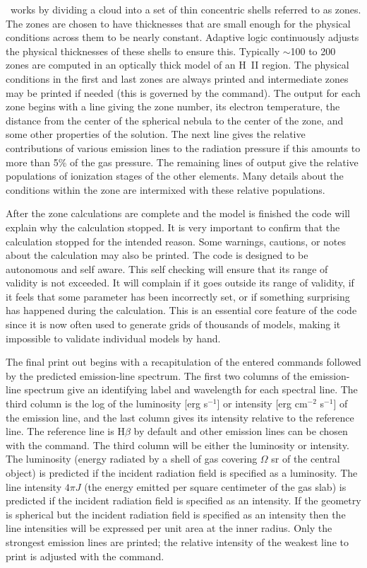 \Cloudy\ works by dividing a cloud into a set of thin concentric shells
referred to as zones. The zones are chosen to have thicknesses that are
small enough for the physical conditions across them to be nearly constant.
Adaptive logic continuously adjusts the physical thicknesses of these shells
to ensure this.  Typically $\sim$100 to 200 zones are computed in an optically
thick model of an H~II region.  The physical conditions in the first and
last zones are always printed and intermediate zones may be printed if needed
(this is governed by the  command).
The output for each zone begins with a line giving the zone number, its
electron temperature, the distance from the center of the spherical nebula
to the center of the zone, and some other properties of the solution.  The
next line gives the relative contributions of various emission lines to
the radiation pressure if this amounts to more than 5\% of the gas pressure.
The remaining lines of output give the relative populations of
ionization stages of the other elements.
Many details about the conditions within the zone are
intermixed with these relative populations.

After the zone calculations are complete and the model is finished the
code will explain why the calculation stopped.  It is very important to
confirm that the calculation stopped for the intended reason.  Some warnings,
cautions, or notes about the calculation may also be printed.  The code
is designed to be autonomous and self aware.  This self checking will ensure
that its range of validity is not exceeded. It will complain if it goes
outside its range of validity, if it feels that some parameter has been
incorrectly set, or if something surprising has happened during the
calculation.  This is an essential core feature of the code since it is
now often used to generate grids of thousands of models, making it impossible
to validate individual models by hand.

The final print out begins with a recapitulation of the entered commands
followed by the predicted emission-line spectrum.  The first two columns
of the emission-line spectrum give an identifying label and wavelength for
each spectral line.  The third column is the log of the luminosity [erg
s$^{-1}$] or intensity [erg cm$^{-2}$ s$^{-1}$] of the emission line, and the last column
gives its intensity relative to the reference line.
The reference line is H$\beta$ by default and other emission lines
can be chosen with the  command.
The third column will be either the luminosity or intensity.
The luminosity (energy radiated by a shell of
gas covering $\Omega$ sr of the central object) is predicted if the incident radiation field is
specified as a luminosity.  The line intensity $4\pi J$ (the energy emitted per
square centimeter of the gas slab) is predicted if the incident radiation field is specified
as an intensity.  If the geometry is spherical but the incident radiation field is specified
as an intensity then the line intensities will be expressed per unit area
at the inner radius.  Only the strongest emission lines are printed; the
relative intensity of the weakest line to print is adjusted with the
 command.

